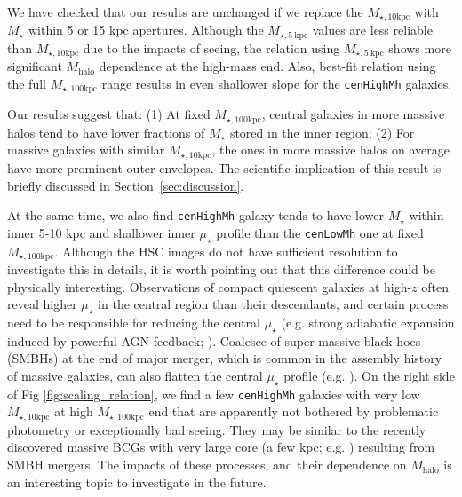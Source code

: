 \documentclass[a4paper,fleqn,usenatbib]{mnras}
\def\rbcg{\texttt{cenHighMh}}
\def\nbcg{\texttt{cenLowMh}}
\def\mstar{{$M_{\star}$}}
\def\mhalo{{$M_{\mathrm{halo}}$}}
\def\minn{{$M_{\star,10\mathrm{kpc}}$}}
\def\mtot{{$M_{\star,100\mathrm{kpc}}$}}
\def\mden{{$\mu_{\star}$}}
\begin{document}
    We have checked that our results are unchanged if we replace the \minn{} with 
    \mstar{} within 5 or 15 kpc apertures. 
    Although the $M_{\star, 5\ \mathrm{kpc}}$ values are less reliable than \minn{} 
    due to the impacts of seeing, the relation using $M_{\star, 5\ \mathrm{kpc}}$ shows 
    more significant \mhalo{} dependence at the high-mass end.
    Also, best-fit relation using the full \mtot{} range results in even shallower 
    slope for the \rbcg{} galaxies.
     
    Our results suggest that: 
    (1) At fixed \mtot{}, central galaxies in more massive halos tend to have 
    lower fractions of \mstar{} stored in the inner region; 
    (2) For massive galaxies with similar \minn{}, the ones in more massive halos on 
    average have more prominent outer envelopes. 
    The scientific implication of this result is briefly discussed in 
    Section~\ref{sec:discussion}.

    At the same time, we also find \rbcg{} galaxy tends to have lower \mstar{} within 
    inner 5-10 kpc and shallower inner \mden{} profile than the \nbcg{} one at 
    fixed \mtot{}. 
    Although the HSC images do not have sufficient resolution to investigate this in 
    details, it is worth pointing out that this difference could be physically 
    interesting. 
    Observations of compact quiescent galaxies at high-$z$ often reveal higher 
    \mden{} in the central region than their descendants, and certain process need to  
    be responsible for reducing the central \mden{} (e.g. strong adiabatic expansion 
    induced by powerful AGN feedback; \citealt{Fan2008}).
    Coalesce of super-massive black hoes (SMBHs) at the end of major merger, which is 
    common in the assembly history of massive galaxies, can also flatten the central 
    \mden{} profile (e.g. \citealt{Milosavljevi2002}).
    On the right side of Fig \ref{fig:scaling_relation}, we find a few \rbcg{} galaxies 
    with very low \minn{} at high \mtot{} end that are apparently not bothered by 
    problematic photometry or exceptionally bad seeing.  
    They may be similar to the recently discovered massive BCGs with very large core 
    (a few kpc; e.g. \citealt{Postman2012, LopezCruz2014}) resulting from SMBH mergers.
    The impacts of these processes, and their dependence on \mhalo{} is an interesting 
    topic to investigate in the future.

    
\end{document}
